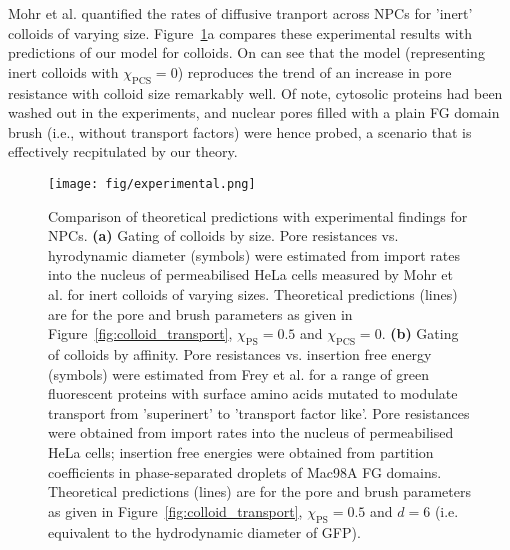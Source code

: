 \documentclass[12pt, a4paper]{article}
\begin{document}
Mohr et al. quantified the rates of diffusive tranport across NPCs for 'inert' colloids of varying size. Figure~\ref{fig:NPC_comparison}a compares these experimental results with predictions of our model for colloids.
On can see that the model (representing inert colloids with $\chi_{\text{PCS}} = 0$) reproduces the trend of an increase in pore resistance with colloid size remarkably well.
Of note, cytosolic proteins had been washed out in the experiments, and nuclear pores filled with a plain FG domain brush (i.e., without transport factors) were hence probed, a scenario that is effectively recpitulated by our theory. 

\begin{figure}
    \centering
    \texttt{[image: fig/experimental.png]}
    \caption{
    Comparison of theoretical predictions with experimental findings for NPCs.
    \textbf{(a)} Gating of colloids by size.
    Pore resistances vs. hyrodynamic diameter (symbols) were estimated from import rates into the nucleus of permeabilised HeLa cells measured by Mohr et al. for inert colloids of varying sizes.
    Theoretical predictions (lines) are for the pore and brush parameters as given in Figure~\ref{fig:colloid_transport}, $\chi_{\text{PS}} = 0.5$ and $\chi_{\text{PCS}} = 0$.
    \textbf{(b)} Gating of colloids by affinity.
    Pore resistances vs. insertion free energy (symbols) were estimated from Frey et al. for a range of green fluorescent proteins with surface amino acids mutated to modulate transport from 'superinert' to 'transport factor like'.
    Pore resistances were obtained from import rates into the nucleus of permeabilised HeLa cells; insertion free energies were obtained from partition coefficients in phase-separated droplets of Mac98A FG domains.
    Theoretical predictions (lines) are for the pore and brush parameters as given in Figure~\ref{fig:colloid_transport}, $\chi_{\text{PS}} = 0.5$ and $d = 6$ (i.e. equivalent to the hydrodynamic diameter of GFP).    
    }
    \label{fig:NPC_comparison}
\end{figure}
\end{document}
